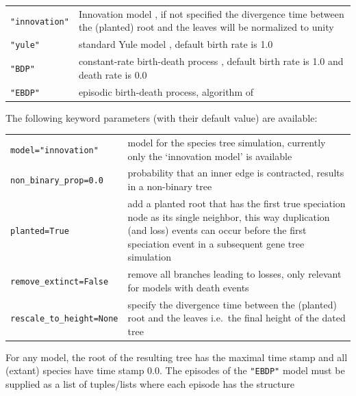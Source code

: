 \documentclass[hidelinks,11pt]{article}
\begin{document}
\vspace{3mm}
{\small\centering
	\begin{longtable}{ p{3.5cm} p{10cm} }
		\texttt{"innovation"} & Innovation model \citet{keller-schmidt2012}, if not specified the divergence time between the (planted) root and the leaves will be normalized to unity\\
		\texttt{"yule"}  & standard Yule model \citep{yule1924}, default birth rate is 1.0 \\
		\texttt{"BDP"} & constant-rate birth-death process \citep[see e.g.][]{kendall1948,hagen2018}, default birth rate is 1.0 and death rate is 0.0 \\
		\texttt{"EBDP"} & episodic birth-death process, algorithm of \cite{stadler2011} \\
	\end{longtable}
}
\vspace{3mm}

\noindent
The following keyword parameters (with their default value) are available:

\vspace{3mm}
{\small\centering
\begin{longtable}{ p{3.5cm} p{10cm} }
	\texttt{model="innovation"}  & model for the species tree simulation, currently only the `innovation model' is available\\
	\texttt{non\_binary\_prop=0.0} & probability that an inner edge is contracted,
	results in a non-binary tree\\
	\texttt{planted=True} & add a planted root that has the first true speciation node as its
	single neighbor, this way duplication (and loss) events can occur before the first speciation event in a subsequent gene tree simulation\\
	\texttt{remove\_extinct=\newline False} & remove all branches leading to losses, only relevant for models with death events\\
	\texttt{rescale\_to\_height=\newline None} & specify the divergence time between the (planted) root and the leaves i.e.\ the final height of the dated tree\\
\end{longtable}
}
\vspace{3mm}

For any model, the root of the resulting tree has the maximal time stamp and all (extant) species have time stamp 0.0.
The episodes of the \texttt{"EBDP"} model must be supplied as a list of tuples/lists where each episode has the structure
\end{document}
